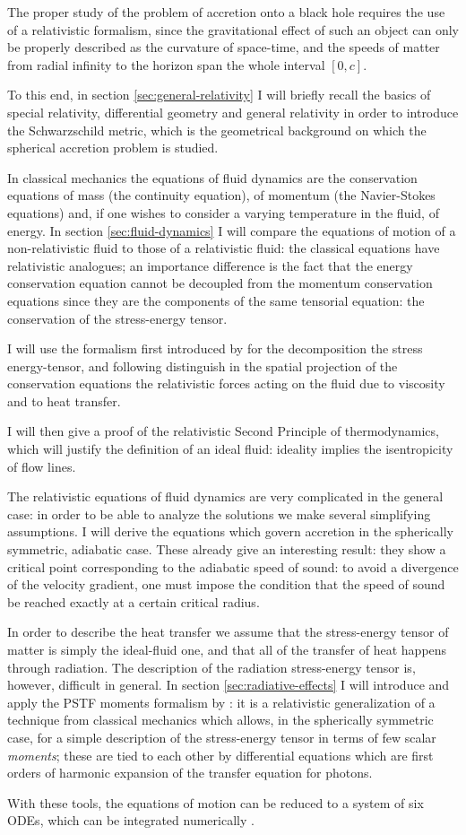 \documentclass[main.tex]{subfiles}
\begin{document}
The proper study of the problem of accretion onto a black hole requires the use of a relativistic formalism, since the gravitational effect of such an object can only be properly described as the curvature of space-time, and the speeds of matter from radial infinity to the horizon span the whole interval \([0, c]\).

To this end, in section \ref{sec:general-relativity} I will briefly recall the basics of special relativity, differential geometry and general relativity in order to introduce the Schwarzschild metric, which is the geometrical background on which the spherical accretion problem is studied.

In classical mechanics the equations of fluid dynamics are the conservation equations of mass (the continuity equation), of momentum (the Navier-Stokes equations) and, if one wishes to consider a varying temperature in the fluid, of energy.
In section \ref{sec:fluid-dynamics} I will compare the equations of motion of a non-relativistic fluid to those of a relativistic fluid: the classical equations have relativistic analogues; an importance difference is the fact that the energy conservation equation cannot be decoupled from the momentum conservation equations since they are the components of the same tensorial equation: the conservation of the stress-energy tensor.

I will use the formalism first introduced by \textcite[]{Eckart:1940} for the decomposition the stress energy-tensor, and following \textcite[]{Taub:1978} distinguish in the spatial projection of the conservation equations the relativistic forces acting on the fluid due to viscosity and to heat transfer.

I will then give a proof of the relativistic Second Principle of thermodynamics, which will justify the definition of an ideal fluid: ideality implies the isentropicity of flow lines.

The relativistic equations of fluid dynamics are very complicated in the general case: in order to be able to analyze the solutions we make several simplifying assumptions.
I will derive the equations which govern accretion in the spherically symmetric, adiabatic case. These already give an interesting result: they show a critical point corresponding to the adiabatic speed of sound: to avoid a divergence of the velocity gradient, one must impose the condition that the speed of sound be reached exactly at a certain critical radius.

In order to describe the heat transfer we assume that the stress-energy tensor of matter is simply the ideal-fluid one, and that all of the transfer of heat happens through radiation.
The description of the radiation stress-energy tensor is, however, difficult in general.
In section \ref{sec:radiative-effects} I will introduce and apply the PSTF moments formalism by \textcite[]{Thorne:1981feb}: it is a relativistic generalization of a technique from classical mechanics which allows, in the spherically symmetric case, for a simple description of the stress-energy tensor in terms of few scalar \emph{moments}; these are tied to each other by differential equations which are first orders of harmonic expansion of the transfer equation for photons.

With these tools, the equations of motion can be reduced to a system of six ODEs, which can be integrated numerically \cite[]{NobiliTurollaZampieri:1991dec}.
\end{document}
